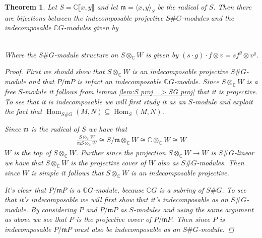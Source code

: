 \documentclass[11pt, a4paper, english]{article}
\numberwithin{prop}{section}
\numberwithin{lemma}{section}
\newtheorem{theorem}{Theorem}
\numberwithin{theorem}{section}
\numberwithin{defin}{section}
\numberwithin{example}{section}
\newcommand{\C}{\mathbb{C}}
\DeclareMathOperator{\Hom}{Hom}
\begin{document}
\begin{theorem}
Let $S = \C\llbracket x, y \rrbracket$ and let $\mathfrak{m} = \langle x, y \rangle_S$ be the radical of $S$. Then there are bijections between the indecomposable projective $S\#G$-modules and the indecomposable $\C G$-modules given by

\\
Where the $S\#G$-module structure on $S \otimes_\C W$ is given by $(s \cdot g) \cdot f \otimes v = sf^g \otimes v^g$.

\begin{proof}
First we should show that $S \otimes_\C W$ is an indecomposable projective $S\#G$-module and that $P/\mathfrak{m}P$ is infact an indecomposable $\C G$-module. Since $S \otimes_\C W$ is a free $S$-module it follows from lemma \ref{lem:S proj => SG proj} that it is projective. To see that it is indecomposable we will first study it as an $S$-module and exploit the fact that $\Hom_{S\#G}(M,N) \subseteq \Hom_S(M,N)$. 

Since $\mathfrak{m}$ is the radical of $S$ we have that 
\begin{align*}
\frac{S \otimes_\C W}{\mathfrak{m}S \otimes_\C W} \cong S/\mathfrak{m} \otimes_\C W \cong \C \otimes_\C W \cong W
\end{align*}
$W$ is the top of $S \otimes_\C W$. Further since the projection $S \otimes_\C W \to W$ is $S\#G$-linear we have that $S \otimes_\C W$ is the projective cover of $W$ also as $S\#G$-modules. Then since $W$ is simple it follows that $S \otimes_\C W$ is an indecomposable projective.

It's clear that $P/\mathfrak{m}P$ is a $\C G$-module, because $\C G$ is a subring of $S\#G$. To see that it's indecomposable we will first show that it's indecomposable as an $S\#G$-module. By considering $P$ and $P/\mathfrak{m}P$ as $S$-modules and using the same argument as above we see that $P$ is the projective cover of $P/\mathfrak{m}P$. Then since $P$ is indecomposable $P/\mathfrak{m}P$ must also be indecomposable as an $S\#G$-module.


\end{proof}
\end{theorem}
\end{document}
